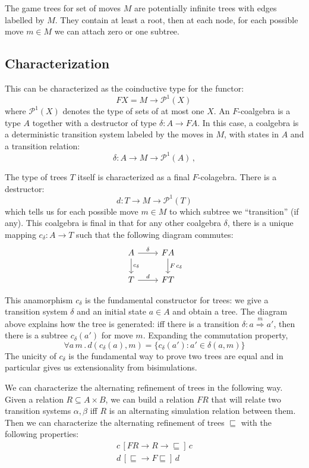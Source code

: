 \documentclass{article}
\begin{document}
The game trees for set of moves $M$
are potentially infinite trees with
edges labelled by $M$.
They contain at least a root,
then at each node,
for each possible move $m \in M$
we can attach zero or one subtree.

\subsection{Characterization}

This can be characterized as the coinductive type for the functor:
\[ F X = M \rightarrow \mathcal{P}^1(X)\, \]
where $\mathcal{P}^1(X)$ denotes the type of sets of at most one $X$.
An $F$-coalgebra is a type $A$
together with a destructor of type $\delta : A \rightarrow F A$.
In this case, a coalgebra is a deterministic transition system
labeled by the moves in $M$,
with states in $A$ and a transition relation:
\[ \delta : A \rightarrow M \rightarrow \mathcal{P}^1(A) \, , \]

The type of trees $T$ itself is characterized as a final $F$-colagebra.
There is a destructor:
\[ d : T \rightarrow M \rightarrow \mathcal{P}^1(T) \]
which tells us for each possible move $m \in M$
to which subtree we ``transition'' (if any).
This coalgebra is final in that for any other coalgebra $\delta$,
there is a unique mapping $c_{\delta} : A \rightarrow T$
such that the following diagram commutes:
\[
  \begin{tikzcd}
    A \arrow[r, "\delta"]
      \arrow[d, "c_{\delta}"] &
    F A \arrow[d, "F \, c_\delta"] \\
    T \arrow[r, "d"] &
    F T
  \end{tikzcd}
\]

This anamorphism $c_\delta$ is
the fundamental constructor for trees:
we give a transition system $\delta$ and an initial state $a \in A$
and obtain a tree.
The diagram above explains how the tree is generated:
iff there is a transition $\delta : a \stackrel{m}{\Longrightarrow} a'$,
then there is a subtree $c_{\delta}(a')$ for move $m$.
Expanding the commutation property,
\[
  \forall a \, m \,.\,
    d(c_{\delta}(a), m) = \{ c_{\delta}(a') : a' \in \delta(a, m) \}
\]
The unicity of $c_\delta$ is
the fundamental way to prove two trees are equal
and in particular gives us extensionality from bisimulations.

We can characterize the alternating refinement of trees
in the following way.
Given a relation $R \subseteq A \times B$,
we can build a relation $F R$ that will relate
two transition systems $\alpha, \beta$ iff
$R$ is an alternating simulation relation between them.
Then we can characterize the alternating refinement of trees $\sqsubseteq$
with the following properties:
\begin{gather*}
  c \, [F R \rightarrow R \rightarrow {\sqsubseteq}] \, c \\
  d \, [{\sqsubseteq} \rightarrow F {\sqsubseteq}] \, d
\end{gather*}
\end{document}
